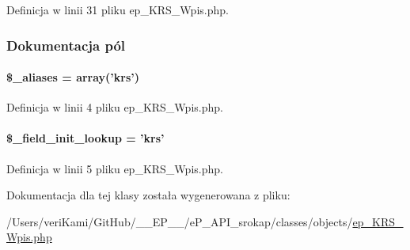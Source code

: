 Definicja w linii 31 pliku ep\-\_\-\-K\-R\-S\-\_\-\-Wpis.\-php.



\subsubsection{Dokumentacja pól}
\hypertarget{classep___k_r_s___wpis_ab4e31d75f0bc5d512456911e5d01366b}{
\paragraph[{\$\-\_\-aliases}]{\setlength{\rightskip}{0pt plus 5cm}\$\-\_\-aliases = array('krs')}}\label{classep___k_r_s___wpis_ab4e31d75f0bc5d512456911e5d01366b}


Definicja w linii 4 pliku ep\-\_\-\-K\-R\-S\-\_\-\-Wpis.\-php.

\hypertarget{classep___k_r_s___wpis_a4a4d54ae35428077a7c61ec8a5139af3}{
\paragraph[{\$\-\_\-field\-\_\-init\-\_\-lookup}]{\setlength{\rightskip}{0pt plus 5cm}\$\-\_\-field\-\_\-init\-\_\-lookup = 'krs'}}\label{classep___k_r_s___wpis_a4a4d54ae35428077a7c61ec8a5139af3}


Definicja w linii 5 pliku ep\-\_\-\-K\-R\-S\-\_\-\-Wpis.\-php.



Dokumentacja dla tej klasy została wygenerowana z pliku\-:\begin{DoxyCompactItemize}
\item 
/\-Users/veri\-Kami/\-Git\-Hub/\-\_\-\-\_\-\-E\-P\-\_\-\-\_\-/e\-P\-\_\-\-A\-P\-I\-\_\-srokap/classes/objects/\hyperlink{ep___k_r_s___wpis_8php}{ep\-\_\-\-K\-R\-S\-\_\-\-Wpis.\-php}\end{DoxyCompactItemize}
